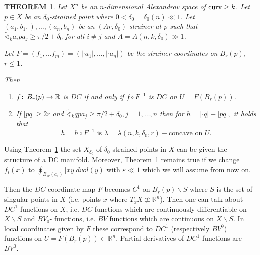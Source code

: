 \documentclass[12pt,leqno]{amsart}
\numberwithin{equation}{section}
\newtheorem{thm}{THEOREM}[section]
\theoremstyle{definition}
\theoremstyle{remark}
\newcommand{\R}{\mathbb{R}}
\def\co{\colon\thinspace}
\def\eps{\varepsilon}
\newcommand{\curv}{\mathop{\rm curv}}
\begin{document}
\begin{thm}\label{thm-DC-Per}
Let $X^n$ be an $n$-dimensional Alexandrov space of $\curv\ge k$. Let $p\in X$ be an $\delta_0$-strained point where $0<\delta_0=\delta_0(n)\ll 1$. Let $ (a_1,b_1,),\ldots, (a_n,b_n)$ be an $(Ar,\delta_0)$ strainer at $p$ such that $\tilde\sphericalangle_ka_ipa_j\ge \pi/2+\delta_0$ for all $i\ne j$ and $A=A(n,k,\delta_0)\gg 1$.

Let  $F=(f_1,\ldots f_m)=(|\cdot a_1|,\ldots, |\cdot a_n|)$ be the strainer coordinates on $B_r(p)$, $r\le 1$.

Then

\begin{enumerate}
\item $f\co B_r(p)\to \R$ is $DC$ if and only if $f\circ F^{-1}$ is $DC$ on $U=F(B_r(p))$.
\item\label{semiconcave} If  $ |pq|\ge 2r$ and  $\tilde\sphericalangle_k qpa_j\ge \pi/2+\delta_0,  j=1,\ldots, n$ then for  $h=|\cdot q|-|pq|,$   it holds that
\[
\bar h=h\circ F^{-1} \text{ is } \lambda=\lambda(n, k,\delta_0,r)-\text{concave on } U.
\]
 \end{enumerate}
\end{thm}

Using Theorem~\ref{thm-DC-Per} the set $X_{\delta_0}$ of $\delta_0$-strained points in $X$ can be given the structure of a DC manifold. Moreover, Theorem~\ref{thm-DC-Per} remains true if we change  $f_i(x)$ to $\oint_{B_{\eps r}(a_1)}|xy|dvol(y)$ with $\eps\ll 1$ which we will assume from now on.

Then the $DC$-coordinate map $F$ becomes $C^1$ on $B_r(p)\backslash S$ where $S$ is the set of singular points in $X$ (i.e. points $x$ where $T_xX\ncong \R^n$).
Then one can talk about $DC^1$-functions on $X$, i.e. $DC$ functions which are continuously differentiable on $X\backslash S$ and $BV_0$- functions, i.e. $BV$ functions which are continuous on $X\backslash S$.
In local coordinates given by $F$ these correspond to $DC^1$ (respectively $BV^0$) functions on $U=F(B_r(p))\subset \R^n$.
Partial derivatives of $DC^1$ functions are $BV^0$.
\end{document}
